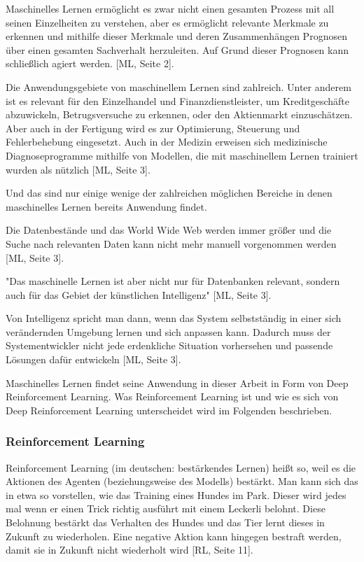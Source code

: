 Maschinelles Lernen ermöglicht es zwar nicht einen gesamten Prozess mit all seinen Einzelheiten zu verstehen, aber es ermöglicht relevante Merkmale zu erkennen und mithilfe dieser Merkmale und deren Zusammenhängen Prognosen über einen gesamten Sachverhalt herzuleiten. Auf Grund dieser Prognosen kann schließlich agiert werden. [ML, Seite 2].

Die Anwendungsgebiete von maschinellem Lernen sind zahlreich. Unter anderem ist es relevant für den Einzelhandel und Finanzdienstleister, um Kreditgeschäfte abzuwickeln, Betrugsversuche zu erkennen, oder den Aktienmarkt einzuschätzen. Aber auch in der Fertigung wird es zur Optimierung, Steuerung und Fehlerbehebung eingesetzt. Auch in der Medizin erweisen sich medizinische Diagnoseprogramme mithilfe von Modellen, die mit maschinellem Lernen trainiert wurden als nützlich [ML, Seite 3].

Und das sind nur einige wenige der zahlreichen möglichen Bereiche in denen maschinelles Lernen bereits Anwendung findet. 

Die Datenbestände und das World Wide Web werden immer größer und die Suche nach relevanten Daten kann nicht mehr manuell vorgenommen werden [ML, Seite 3].

"Das maschinelle Lernen ist aber nicht nur für Datenbanken relevant, sondern auch für das Gebiet der künstlichen Intelligenz" [ML, Seite 3].

Von Intelligenz spricht man dann, wenn das System selbstständig in einer sich verändernden Umgebung lernen und sich anpassen kann. Dadurch muss der Systementwickler nicht jede erdenkliche Situation vorhersehen und passende Lösungen dafür entwickeln [ML, Seite 3].
 
Maschinelles Lernen findet seine Anwendung in dieser Arbeit in Form von Deep Reinforcement Learning. Was Reinforcement Learning ist und wie es sich von Deep Reinforcement Learning unterscheidet wird im Folgenden beschrieben.
\subsubsection{Reinforcement Learning}
Reinforcement Learning (im deutschen: bestärkendes Lernen) heißt so, weil es die Aktionen des Agenten (beziehungsweise des Modells) bestärkt. Man kann sich das in etwa so vorstellen, wie das Training eines Hundes im Park. Dieser wird jedes mal wenn er einen Trick richtig ausführt mit einem Leckerli belohnt. Diese Belohnung bestärkt das Verhalten des Hundes und das Tier lernt dieses in Zukunft zu wiederholen. Eine negative Aktion kann hingegen bestraft werden, damit sie in Zukunft nicht wiederholt wird [RL, Seite 11].

